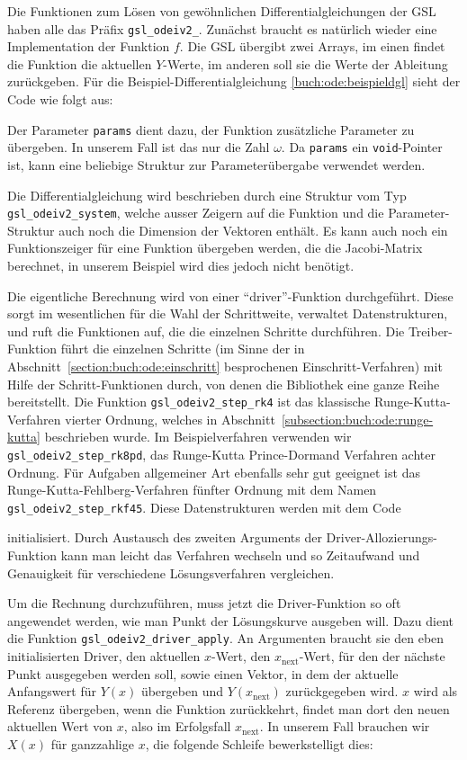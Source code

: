 Die Funktionen zum Lösen von gewöhnlichen Differentialgleichungen
der GSL haben alle das Präfix \texttt{gsl\_odeiv2\_}. 
Zunächst braucht es natürlich wieder eine Implementation der
Funktion $f$. 
Die GSL übergibt zwei Arrays, im einen findet die Funktion die aktuellen
$Y$-Werte, im anderen soll sie die Werte der Ableitung zurückgeben.
Für die Beispiel-Differentialgleichung \eqref{buch:ode:beispieldgl}
sieht der Code wie folgt aus:

Der Parameter \texttt{params} dient dazu, der Funktion zusätzliche
Parameter zu übergeben.
In unserem Fall ist das nur die Zahl $\omega$.
Da \texttt{params} ein \texttt{void}-Pointer ist, kann eine beliebige
Struktur zur Parameterübergabe verwendet werden.

Die Differentialgleichung wird beschrieben durch eine Struktur vom Typ
\texttt{gsl\_odeiv2\_system}, welche ausser Zeigern auf die Funktion
und die Parameter-Struktur auch noch die Dimension der Vektoren enthält.
Es kann auch noch ein Funktionszeiger für eine Funktion übergeben
werden, die die Jacobi-Matrix berechnet, in unserem Beispiel wird dies
jedoch nicht benötigt.

Die eigentliche Berechnung wird von einer ``driver''-Funktion durchgeführt.
Diese sorgt im wesentlichen für die Wahl der Schrittweite, verwaltet
Datenstrukturen, und ruft die Funktionen auf, die die einzelnen Schritte
durchführen.
Die Treiber-Funktion führt die einzelnen Schritte (im Sinne der
in Abschnitt~\ref{section:buch:ode:einschritt} besprochenen
Einschritt-Verfahren) mit
Hilfe der Schritt-Funktionen durch, von denen die Bibliothek eine
ganze Reihe bereitstellt.
Die Funktion \texttt{gsl\_odeiv2\_step\_rk4} ist das klassische
Runge-Kutta-Verfahren vierter Ordnung, welches in
Abschnitt~\ref{subsection:buch:ode:runge-kutta}
beschrieben wurde.
Im Beispielverfahren verwenden wir \texttt{gsl\_odeiv2\_step\_rk8pd},
das Runge-Kutta Prince-Dormand Verfahren achter Ordnung.
Für Aufgaben allgemeiner Art ebenfalls sehr gut geeignet ist das
Runge-Kutta-Fehlberg-Verfahren fünfter Ordnung mit dem Namen
\texttt{gsl\_odeiv2\_step\_rkf45}.
Diese Datenstrukturen werden mit dem Code

initialisiert.
Durch Austausch des zweiten Arguments der Driver-Allozierungs-Funktion
kann man leicht das Verfahren wechseln und so Zeitaufwand und Genauigkeit
für verschiedene Lösungsverfahren vergleichen.

Um die Rechnung durchzuführen, muss jetzt die Driver-Funktion so oft
angewendet werden, wie man Punkt der Lösungskurve ausgeben will.
Dazu dient die Funktion \texttt{gsl\_odeiv2\_driver\_apply}. 
An Argumenten braucht sie den eben initialisierten Driver, den aktuellen
$x$-Wert, den $x_{\text{next}}$-Wert, für den der nächste Punkt
ausgegeben werden soll, sowie einen Vektor, in dem der aktuelle Anfangswert
für $Y(x)$ übergeben und $Y(x_{\text{next}})$ zurückgegeben wird.
$x$ wird als Referenz übergeben, wenn die Funktion zurückkehrt,
findet man dort den neuen aktuellen Wert von $x$, also im Erfolgsfall
$x_{\text{next}}$.
In unserem Fall brauchen wir $X(x)$ für ganzzahlige $x$, die folgende
Schleife bewerkstelligt dies:


